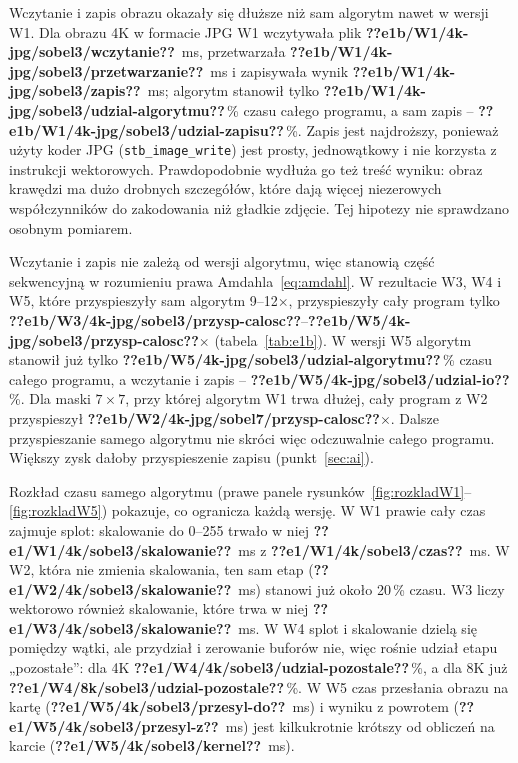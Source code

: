 \documentclass[12pt,a4paper]{article}
\providecommand{\wynik}[1]{\textbf{??#1??}}
\newcommand{\kod}[1]{\texttt{#1}}
\begin{document}
Wczytanie i zapis obrazu okazały się dłuższe niż sam algorytm nawet w wersji W1. Dla obrazu 4K w formacie JPG W1 wczytywała plik \wynik{e1b/W1/4k-jpg/sobel3/wczytanie}~ms, przetwarzała \wynik{e1b/W1/4k-jpg/sobel3/przetwarzanie}~ms i zapisywała wynik \wynik{e1b/W1/4k-jpg/sobel3/zapis}~ms; algorytm stanowił tylko \wynik{e1b/W1/4k-jpg/sobel3/udzial-algorytmu}\,\% czasu całego programu, a sam zapis -- \wynik{e1b/W1/4k-jpg/sobel3/udzial-zapisu}\,\%. Zapis jest najdroższy, ponieważ użyty koder JPG (\kod{stb\_image\_write}) jest prosty, jednowątkowy i nie korzysta z instrukcji wektorowych. Prawdopodobnie wydłuża go też treść wyniku: obraz krawędzi ma dużo drobnych szczegółów, które dają więcej niezerowych współczynników do zakodowania niż gładkie zdjęcie. Tej hipotezy nie sprawdzano osobnym pomiarem.

Wczytanie i zapis nie zależą od wersji algorytmu, więc stanowią część sekwencyjną w rozumieniu prawa Amdahla~\eqref{eq:amdahl}. W rezultacie W3, W4 i W5, które przyspieszyły sam algorytm 9--12$\times$, przyspieszyły cały program tylko \wynik{e1b/W3/4k-jpg/sobel3/przysp-calosc}--\wynik{e1b/W5/4k-jpg/sobel3/przysp-calosc}$\times$ (tabela~\ref{tab:e1b}). W wersji W5 algorytm stanowił już tylko \wynik{e1b/W5/4k-jpg/sobel3/udzial-algorytmu}\,\% czasu całego programu, a wczytanie i zapis -- \wynik{e1b/W5/4k-jpg/sobel3/udzial-io}\,\%. Dla maski $7\times7$, przy której algorytm W1 trwa dłużej, cały program z W2 przyspieszył \wynik{e1b/W2/4k-jpg/sobel7/przysp-calosc}$\times$. Dalsze przyspieszanie samego algorytmu nie skróci więc odczuwalnie całego programu. Większy zysk dałoby przyspieszenie zapisu (punkt~\ref{sec:ai}).

Rozkład czasu samego algorytmu (prawe panele rysunków~\ref{fig:rozkladW1}--\ref{fig:rozkladW5}) pokazuje, co ogranicza każdą wersję. W W1 prawie cały czas zajmuje splot: skalowanie do 0--255 trwało w niej \wynik{e1/W1/4k/sobel3/skalowanie}~ms z \wynik{e1/W1/4k/sobel3/czas}~ms. W W2, która nie zmienia skalowania, ten sam etap (\wynik{e1/W2/4k/sobel3/skalowanie}~ms) stanowi już około 20\,\% czasu. W3 liczy wektorowo również skalowanie, które trwa w niej \wynik{e1/W3/4k/sobel3/skalowanie}~ms. W W4 splot i skalowanie dzielą się pomiędzy wątki, ale przydział i zerowanie buforów nie, więc rośnie udział etapu „pozostałe”: dla 4K \wynik{e1/W4/4k/sobel3/udzial-pozostale}\,\%, a dla 8K już \wynik{e1/W4/8k/sobel3/udzial-pozostale}\,\%. W W5 czas przesłania obrazu na kartę (\wynik{e1/W5/4k/sobel3/przesyl-do}~ms) i wyniku z powrotem (\wynik{e1/W5/4k/sobel3/przesyl-z}~ms) jest kilkukrotnie krótszy od obliczeń na karcie (\wynik{e1/W5/4k/sobel3/kernel}~ms).
\end{document}
